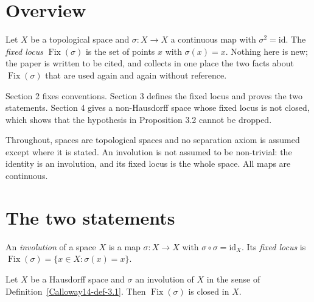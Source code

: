 
\section*{Overview}
Let $X$ be a topological space and $\sigma \colon X \to X$ a continuous map with $\sigma^2 = \mathrm{id}$. The \emph{fixed locus} $\operatorname{Fix}(\sigma)$ is the set of points $x$ with $\sigma(x) = x$. Nothing here is new; the paper is written to be cited, and collects in one place the two facts about $\operatorname{Fix}(\sigma)$ that are used again and again without reference.

Section 2 fixes conventions. Section 3 defines the fixed locus and proves the two statements. Section 4 gives a non-Hausdorff space whose fixed locus is not closed, which shows that the hypothesis in Proposition 3.2 cannot be dropped.

\begin{theorem}\label{Calloway14-setup}
Throughout, spaces are topological spaces and no separation axiom is assumed except where it is stated. An involution is not assumed to be non-trivial: the identity is an involution, and its fixed locus is the whole space. All maps are continuous.
\end{theorem}

\section{The two statements}\label{Calloway14-sec-3}

\begin{definition}\label{Calloway14-def-3.1}
\label{Calloway14-def:involution}
An \emph{involution} of a space $X$ is a map $\sigma \colon X \to X$ with $\sigma \circ \sigma = \mathrm{id}_X$. Its \emph{fixed locus} is $\operatorname{Fix}(\sigma) = \{x \in X : \sigma(x) = x\}$.
\end{definition}

\begin{proposition}\label{Calloway14-prop-3.2}
\label{Calloway14-prop:closed}
Let $X$ be a Hausdorff space and $\sigma$ an involution of $X$ in the sense of Definition~\ref{Calloway14-def-3.1}. Then $\operatorname{Fix}(\sigma)$ is closed in $X$.
\end{proposition}

